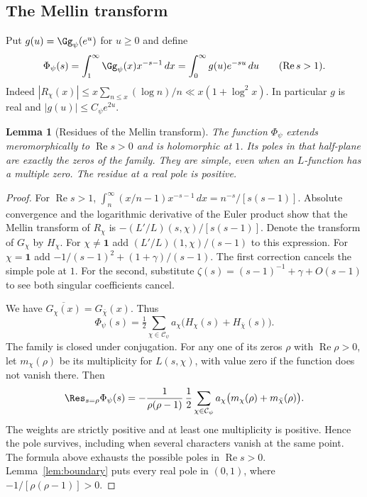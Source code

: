 \documentclass[a4paper,11pt]{article}
\newtheorem{lemma}[proposition]{Lemma}
\theoremstyle{definition}
\theoremstyle{remark}
\newcommand{\real}{\operatorname{Re}}\newcommand{\imag}{\operatorname{Im}}
\numberwithin{equation}{section}
\begin{document}
\subsection{The Mellin transform}\label{nav:I-04}
\label{sec:mellin}
Put \(g(u)=\Gg_\psi(e^u)\) for \(u\ge0\) and define
\[
 \Phi_\psi(s)=\int_1^\infty\Gg_\psi(x)x^{-s-1}\,dx
             =\int_0^\infty g(u)e^{-su}\,du\qquad(\real s>1).
\]
Indeed \(|R_\chi(x)|\le x\sum_{n\le x}(\log n)/n\ll x(1+\log^2x)\). In particular \(g\) is real and \(|g(u)|\le C_\psi e^{2u}\).

\begin{lemma}[Residues of the Mellin transform]\label{lem:mellin}
The function \(\Phi_\psi\) extends meromorphically to \(\real s>0\) and is holomorphic at \(1\). Its poles in that half-plane are exactly the zeros of the family. They are simple, even when an \(L\)-function has a multiple zero. The residue at a real pole is positive.
\end{lemma}
\begin{proof}
For \(\real s>1\),
\(\int_n^\infty(x/n-1)x^{-s-1}\,dx=n^{-s}/[s(s-1)]\).
Absolute convergence and the logarithmic derivative of the Euler product show that the Mellin transform of \(R_\chi\) is \(- (L'/L)(s,\chi)/[s(s-1)]\). Denote the transform of \(G_\chi\) by \(H_\chi\). For \(\chi\ne\mathbf1\) add \((L'/L)(1,\chi)/(s-1)\) to this expression. For \(\chi=\mathbf1\) add \(-1/(s-1)^2+(1+\gamma)/(s-1)\). The first correction cancels the simple pole at \(1\). For the second, substitute \(\zeta(s)=(s-1)^{-1}+\gamma+O(s-1)\) to see both singular coefficients cancel.

We have \(\overline{G_\chi(x)}=G_{\bar\chi}(x)\). Thus
\[
 \Phi_\psi(s)=\tfrac12\sum_{\chi\in\mathcal C_\psi}
                       a_\chi\big(H_\chi(s)+H_{\bar\chi}(s)\big).
\]
The family is closed under conjugation. For any one of its zeros \(\rho\) with \(\real\rho>0\), let \(m_\chi(\rho)\) be its multiplicity for \(L(s,\chi)\), with value zero if the function does not vanish there. Then
\begin{equation}
 \Res_{s=\rho}\Phi_\psi(s)=-\frac{1}{\rho(\rho-1)}
     \,\frac12\sum_{\chi\in\mathcal C_\psi}
          a_\chi\big(m_\chi(\rho)+m_{\bar\chi}(\rho)\big). \label{eq:res}
\end{equation}
The weights are strictly positive and at least one multiplicity is positive. Hence the pole survives, including when several characters vanish at the same point. The formula above exhausts the possible poles in \(\real s>0\). Lemma~\ref{lem:boundary} puts every real pole in \((0,1)\), where \(-1/[\rho(\rho-1)]>0\).
\end{proof}
\end{document}
